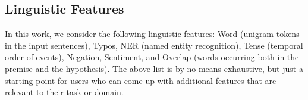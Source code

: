 %


\subsection{Linguistic Features}
\label{sec:extract}

In this work, we consider the following linguistic features: 
Word (unigram tokens in the input sentences), 
Typos, NER (named entity recognition), 
Tense (temporal order of events), Negation, 
Sentiment, and Overlap (words occurring both in the premise and 
the hypothesis). 
The above list is by no means exhaustive, but just a starting point for users 
who can come up with additional features that are relevant
to their task or domain. 

